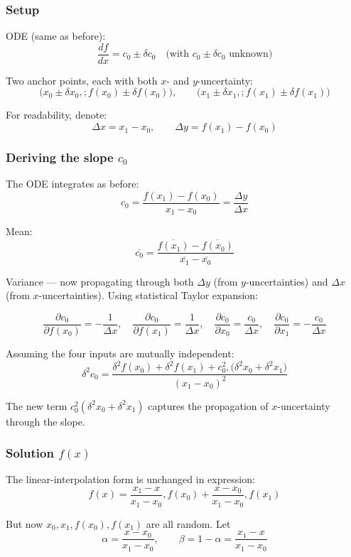 \documentclass[twoside]{article}
\numberwithin{equation}{section}
\begin{document}
\subsubsection{Setup}
ODE (same as before):
$$\frac{df}{dx} = c_0 \pm \delta c_0 \quad \text{(with $c_0 \pm \delta c_0$ unknown)}$$

Two anchor points, each with both $x$- and $y$-uncertainty:
$$\bigl(x_0 \pm \delta x_0,; f(x_0) \pm \delta f(x_0)\bigr), \qquad \bigl(x_1 \pm \delta x_1,; f(x_1) \pm \delta f(x_1)\bigr)$$

For readability, denote:
$$\Delta x = x_1 - x_0, \qquad \Delta y = f(x_1) - f(x_0)$$

\subsubsection{Deriving the slope $c_0$}

The ODE integrates as before:
$$c_0 = \frac{f(x_1) - f(x_0)}{x_1 - x_0} = \frac{\Delta y}{\Delta x}$$

Mean:
$$\overline{c_0} = \frac{\overline{f(x_1)} - \overline{f(x_0)}}{\overline{x_1} - \overline{x_0}}$$

Variance — now propagating through both $\Delta y$ (from $y$-uncertainties) and $\Delta x$ (from $x$-uncertainties). Using statistical Taylor expansion:

$$\frac{\partial c_0}{\partial f(x_0)} = -\frac{1}{\Delta x}, \quad \frac{\partial c_0}{\partial f(x_1)} = \frac{1}{\Delta x}, \quad \frac{\partial c_0}{\partial x_0} = \frac{c_0}{\Delta x}, \quad \frac{\partial c_0}{\partial x_1} = -\frac{c_0}{\Delta x}$$

Assuming the four inputs are mutually independent:
$$\boxed{\delta^2 c_0 = \frac{\delta^2 f(x_0) + \delta^2 f(x_1) + c_0^2, \bigl(\delta^2 x_0 + \delta^2 x_1\bigr)}{(x_1 - x_0)^2}}$$

The new term $c_0^2 (\delta^2 x_0 + \delta^2 x_1)$ captures the propagation of $x$-uncertainty through the slope.

\subsubsection{Solution $f(x)$}

The linear-interpolation form is unchanged in expression:
$$f(x) = \frac{x_1 - x}{x_1 - x_0}, f(x_0) + \frac{x - x_0}{x_1 - x_0}, f(x_1)$$

But now $x_0, x_1, f(x_0), f(x_1)$ are all random. Let
$$\alpha = \frac{x - x_0}{x_1 - x_0}, \qquad \beta = 1 - \alpha = \frac{x_1 - x}{x_1 - x_0}$$
\end{document}
